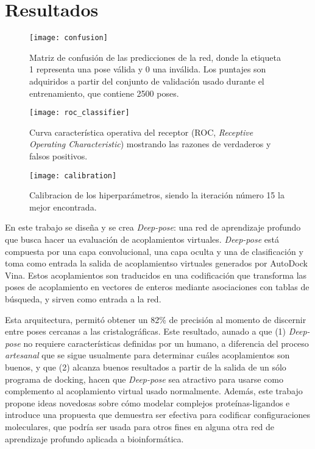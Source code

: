 \section{Resultados}
\begin{figure}[H]
  \texttt{[image: confusion]} \centering
  \caption{Matriz de confusión de las predicciones de la red,
  donde la etiqueta 1 representa una pose válida y 0 una inválida.
  Los puntajes son adquiridos a partir del conjunto de validación
  usado durante el entrenamiento, que contiene 2500 poses.}
\end{figure}

\begin{figure}[H]
  \texttt{[image: roc\_classifier]} \centering
  \caption{Curva característica operativa del receptor (ROC,
  \textit{Receptive Operating Characteristic}) mostrando
  las razones de verdaderos y falsos positivos.}
\end{figure}

\begin{figure}[h]
  \texttt{[image: calibration]} \centering
  \caption{Calibracion de los hiperparámetros, siendo la iteración
  número 15 la mejor encontrada.}
\end{figure}

En este trabajo se diseña y se crea \textit{Deep-pose}: una red de
aprendizaje profundo que busca hacer ua evaluación de acoplamientos
virtuales. \textit{Deep-pose} está compuesta por una capa
convolucional, una capa oculta y una de clasificación y toma como
entrada la salida de acoplamientso virtuales generados por AutoDock
Vina. Estos acoplamientos son traducidos en una codificación que
transforma las poses de acoplamiento en vectores de enteros mediante
asociaciones con tablas de búsqueda, y sirven como entrada a la red.

Esta arquitectura, permitó obtener un 82\% de precisión al momento de
discernir entre poses cercanas a las cristalográficas. Este resultado,
aunado a que (1) \textit{Deep-pose} no requiere características
definidas por un humano, a diferencia del proceso \textit{artesanal}
que se sigue usualmente para determinar cuáles acoplamientos son
buenos, y que (2) alcanza buenos resultados a partir de la salida de
un sólo programa de docking, hacen que \textit{Deep-pose} sea
atractivo para usarse como complemento al acoplamiento virtual usado
normalmente. Además, este trabajo propone ideas novedosas sobre cómo
modelar complejos proteínas-ligandos e introduce una propuesta que
demuestra ser efectiva para codificar configuraciones moleculares, que
podría ser usada para otros fines en alguna otra red de aprendizaje
profundo aplicada a bioinformática.
